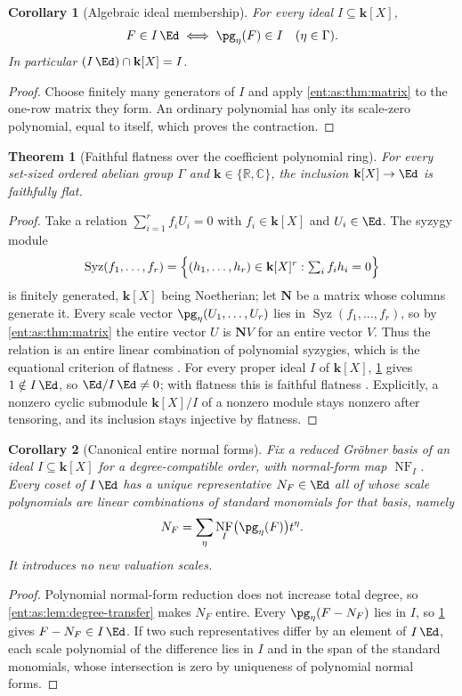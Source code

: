 \documentclass[11pt]{article}
\newtheorem{theorem}{Theorem}[section]
\theoremstyle{plain}
\theoremstyle{plain}
\theoremstyle{plain}
\newtheorem{corollary}[corollary]{Corollary}
\theoremstyle{definition}
\theoremstyle{definition}
\theoremstyle{definition}
\theoremstyle{definition}
\theoremstyle{remark}
\newcommand{\C}{\mathbb C}\newcommand{\R}{\mathbb R}
\newcommand{\kk}{\mathbf k}\newcommand{\PP}{\mathbb P}
\DeclareMathOperator{\NF}{NF}\DeclareMathOperator{\Syz}{Syz}
\begin{document}
\begin{corollary}[Algebraic ideal membership]\label{ent:as:cor:ideal}
For every ideal $I\subseteq\kk[X]$,
\begin{equation}\label{ent:as:eq:ideal-membership}
 F\in I\,\Ed \iff \pg_\eta(F)\in I\quad(\eta\in\Gamma).
\end{equation}
In particular $(I\,\Ed)\cap\kk[X]=I$.
\end{corollary}
\begin{proof}
Choose finitely many generators of $I$ and apply \cref{ent:as:thm:matrix} to
the one-row matrix they form. An ordinary polynomial has only its scale-zero
polynomial, equal to itself, which proves the contraction.
\end{proof}

\begin{theorem}[Faithful flatness over the coefficient polynomial ring]
\label{ent:as:thm:flat}
For every set-sized ordered abelian group $\Gamma$ and $\kk\in\{\R,\C\}$, the
inclusion $\kk[X]\to\Ed$ is faithfully flat.
\end{theorem}
\begin{proof}
Take a relation $\sum_{i=1}^rf_iU_i=0$ with $f_i\in\kk[X]$ and $U_i\in\Ed$. The
syzygy module
\[
 \Syz(f_1,\ldots,f_r)=\Bigl\{(h_1,\ldots,h_r)\in\kk[X]^r:
 \textstyle\sum_if_ih_i=0\Bigr\}
\]
is finitely generated, $\kk[X]$ being Noetherian; let $\mathbf N$ be a matrix
whose columns generate it. Every scale vector $\pg_\eta(U_1,\ldots,U_r)$ lies
in $\Syz(f_1,\ldots,f_r)$, so by \cref{ent:as:thm:matrix} the entire vector $U$
is $\mathbf NV$ for an entire vector $V$. Thus the relation is an entire linear
combination of polynomial syzygies, which is the equational criterion of
flatness \cite[Lemma~10.39.11]{StacksFlat}. For every proper ideal $I$ of
$\kk[X]$, \cref{ent:as:cor:ideal} gives $1\notin I\,\Ed$, so $\Ed/I\,\Ed\ne0$;
with flatness this is faithful flatness \cite[Lemma~10.39.15]{StacksFlat}.
Explicitly, a nonzero cyclic submodule $\kk[X]/I$ of a nonzero module stays
nonzero after tensoring, and its inclusion stays injective by flatness.
\end{proof}

\begin{corollary}[Canonical entire normal forms]\label{ent:as:cor:normal-form}
Fix a reduced Gr\"obner basis of an ideal $I\subseteq\kk[X]$ for a
degree-compatible order, with normal-form map $\NF_I$. Every coset of $I\,\Ed$
has a unique representative $N_F\in\Ed$ all of whose scale polynomials are
linear combinations of standard monomials for that basis, namely
\[
 N_F=\sum_\eta\NF_I\bigl(\pg_\eta(F)\bigr)t^\eta .
\]
It introduces no new valuation scales.
\end{corollary}
\begin{proof}
Polynomial normal-form reduction does not increase total degree, so
\cref{ent:as:lem:degree-transfer} makes $N_F$ entire. Every
$\pg_\eta(F-N_F)$ lies in $I$, so \cref{ent:as:cor:ideal} gives
$F-N_F\in I\,\Ed$. If two such representatives differ by an element of
$I\,\Ed$, each scale polynomial of the difference lies in $I$ and in the span of
the standard monomials, whose intersection is zero by uniqueness of polynomial
normal forms.
\end{proof}
\end{document}
